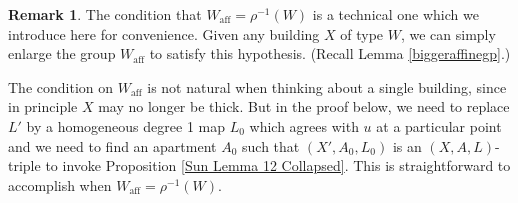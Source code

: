 \documentclass[12pt]{amsart}
\theoremstyle{definition}
\newtheorem{remark}[theorem]{Remark}
\numberwithin{equation}{section}
\newcommand{\Waff}{W_{\mathrm{aff}}}
\begin{document}
\begin{remark}
The condition that $\Waff=\rho^{-1}(W)$ is a technical one which we introduce here for convenience. Given any building $X$ of type $W$, we can simply enlarge the group $\Waff$ to satisfy this hypothesis. (Recall Lemma \ref{biggeraffinegp}.)

The condition on $\Waff$ is not natural when thinking about a single building, since in principle $X$ may no longer be thick. But in the proof below, we need to replace $L'$ by a homogeneous degree 1 map $L_0$ which agrees with $u$ at a particular point and we need to find an apartment $A_0$ such that $(X', A_0, L_0)$ is an $(X,A,L)$-triple to invoke Proposition \ref{Sun Lemma 12 Collapsed}. This is straightforward to accomplish when $\Waff = \rho^{-1}(W)$.
\end{remark}
\end{document}
